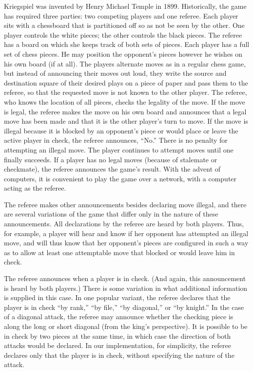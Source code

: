 \documentclass[conference]{IEEEtran}
\begin{document}
Kriegspiel was invented by Henry Michael Temple in 1899.  Historically, the game has required three parties: two
competing players and one referee.  Each player sits with a chessboard that is partitioned off so as not be seen by the
other.  One player controls the white pieces; the other controls the black pieces.  The referee has a board on which she
keeps track of both sets of pieces.  Each player has a full set of chess pieces.  He may position the opponent's pieces
however he wishes on his own board (if at all).  The players alternate moves as in a regular chess game, but instead of
announcing their moves out loud, they write the source and destination square of their desired plays on a piece of paper
and pass them to the referee, so that the requested move is not known to the other player. The referee, who knows the location of
all pieces, checks the legality of the move.  If the move is legal, the referee makes the move on his own board and
announces that a legal move has been made and that it is the other player's turn to move.  If the move is illegal
because it is blocked by an opponent's piece or would place or leave the active player in check, the referee announces,
``No.''  There is no penalty for attempting an illegal move.  The player continues to attempt moves until one finally
succeeds.  If a player has no legal moves (because of stalemate or checkmate), the referee announces the game's result.
With the advent of computers, it is convenient to play the game over a network, with a computer acting as the referee.

The referee makes other announcements besides declaring move illegal, and there are several variations of the game that
differ only in the nature of these announcements.  All declarations by the referee are heard by both players.  Thus, for
example, a player will hear and know if her opponent has attempted an illegal move, and will thus know that her
opponent's pieces are configured in such a way as to allow at least one attemptable move that blocked or would leave him
in check.  

The referee announces when a player is in check.  (And again, this announcement is heard by both players.)  There is
some variation in what additional information is supplied in this case.  In one popular variant, the referee declares
that the player is in check ``by rank,'' ``by file,'' ``by diagonal,'' or ``by knight.''  In the case of a diagonal attack, the
referee may announce whether the checking piece is along the long or short diagonal (from the king's perspective).  It
is possible to be in check by two pieces at the same time, in which case the direction of both attacks would be
declared.  In our implementation, for simplicity, the referee declares only that the player is in check, without
specifying the nature of the attack.
\end{document}

